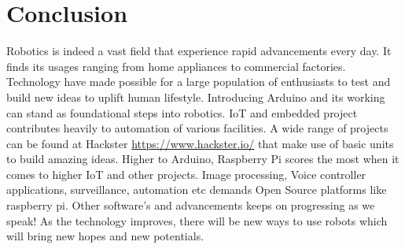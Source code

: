 \chapter*{Conclusion}
\begin{fullwidth}
Robotics is indeed a vast field that experience rapid advancements every day. It finds its usages ranging from home appliances to commercial factories. Technology have made possible for a large population of enthusiasts to test and build new ideas to uplift human lifestyle. Introducing Arduino and its working can stand as foundational steps into robotics. \ac{IoT} and embedded project contributes heavily to automation of various facilities. A wide range of projects can be found at Hackster \url{https://www.hackster.io/} that make use of basic units to build amazing ideas. Higher to Arduino, Raspberry Pi scores the most when it comes to higher \ac{IoT} and other projects. Image processing, Voice controller applications, surveillance, automation etc demands Open Source platforms like raspberry pi. Other software's and advancements keeps on progressing as we speak! As the technology improves, there will be new ways to use robots which will bring new hopes and new potentials. 
\end{fullwidth}